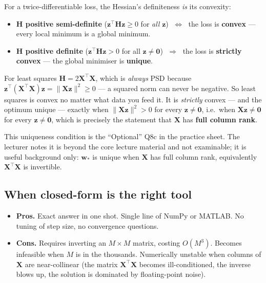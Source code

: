 \documentclass[11pt, a4paper]{article}
\begin{document}
\begin{defbox}
For a twice-differentiable loss, the Hessian's definiteness \emph{is} its convexity:
\begin{itemize}[leftmargin=1.4em, itemsep=0.15em]
  \item \textbf{$\mathbf{H}$ positive semi-definite} ($\mathbf{z}^\top\mathbf{H}\mathbf{z}\ge 0$ for \emph{all} $\mathbf{z}$) $\;\Longleftrightarrow\;$ the loss is \textbf{convex} — every local minimum is a global minimum.
  \item \textbf{$\mathbf{H}$ positive definite} ($\mathbf{z}^\top\mathbf{H}\mathbf{z}> 0$ for all $\mathbf{z}\ne\mathbf{0}$) $\;\Longrightarrow\;$ the loss is \textbf{strictly convex} — the global minimiser is \textbf{unique}.
\end{itemize}
For least squares $\mathbf{H} = 2\mathbf{X}^\top\mathbf{X}$, which is \emph{always} PSD because $\mathbf{z}^\top(\mathbf{X}^\top\mathbf{X})\mathbf{z} = \|\mathbf{X}\mathbf{z}\|^2 \ge 0$ — a squared norm can never be negative. So least squares is convex no matter what data you feed it. It is \emph{strictly} convex — and the optimum unique — exactly when $\|\mathbf{X}\mathbf{z}\|^2 > 0$ for every $\mathbf{z}\ne\mathbf{0}$, i.e.\ when $\mathbf{X}\mathbf{z}\ne\mathbf{0}$ for every $\mathbf{z}\ne\mathbf{0}$, which is precisely the statement that $\mathbf{X}$ has \textbf{full column rank}.
\end{defbox}

This uniqueness condition is the ``Optional'' Q8c in the practice sheet. The lecturer notes it is beyond the core lecture material and not examinable; it is useful background only: $\mathbf{w}_*$ is unique when $\mathbf{X}$ has full column rank, equivalently $\mathbf{X}^\top\mathbf{X}$ is invertible.

\subsection{When closed-form is the right tool}

\begin{itemize}
  \item \textbf{Pros.} Exact answer in one shot. Single line of NumPy or MATLAB. No tuning of step size, no convergence questions.
  \item \textbf{Cons.} Requires inverting an $M\times M$ matrix, costing $O(M^3)$. Becomes infeasible when $M$ is in the thousands. Numerically unstable when columns of $\mathbf{X}$ are near-collinear (the matrix $\mathbf{X}^\top\mathbf{X}$ becomes ill-conditioned, the inverse blows up, the solution is dominated by floating-point noise).
\end{itemize}
\end{document}
